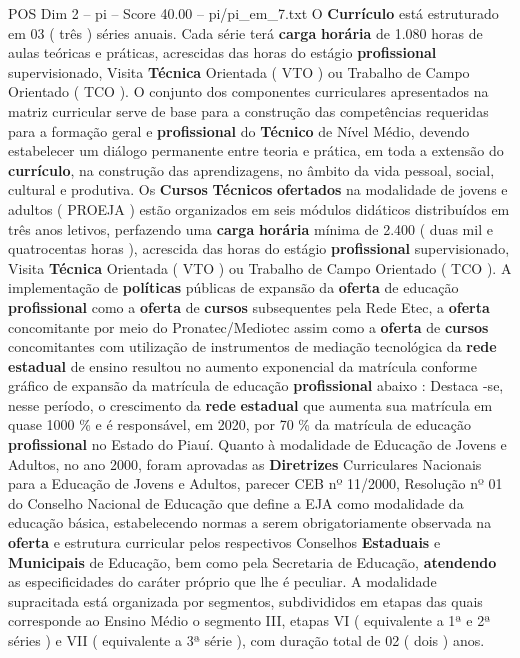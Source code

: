 \begin{textsample}{POS Dim 2 – pi – Score 40.00 – pi/pi\_em\_7.txt}
O \textbf{Currículo} está estruturado em 03 ( três ) séries anuais.
Cada série terá \textbf{carga} \textbf{horária} de 1.080 horas de aulas teóricas e práticas, acrescidas das horas do estágio \textbf{profissional} supervisionado, Visita \textbf{Técnica} Orientada ( VTO ) ou Trabalho de Campo Orientado ( TCO ).
O conjunto dos componentes curriculares apresentados na matriz curricular serve de base para a construção das competências requeridas para a formação geral e \textbf{profissional} do \textbf{Técnico} de Nível Médio, devendo estabelecer um diálogo permanente entre teoria e prática, em toda a extensão do \textbf{currículo}, na construção das aprendizagens, no âmbito da vida pessoal, social, cultural e produtiva.
Os \textbf{Cursos} \textbf{Técnicos} \textbf{ofertados} na modalidade de jovens e adultos ( PROEJA ) estão organizados em seis módulos didáticos distribuídos em três anos letivos, perfazendo uma \textbf{carga} \textbf{horária} mínima de 2.400 ( duas mil e quatrocentas horas ), acrescida das horas do estágio \textbf{profissional} supervisionado, Visita \textbf{Técnica} Orientada ( VTO ) ou Trabalho de Campo Orientado ( TCO ).
A implementação de \textbf{políticas} públicas de expansão da \textbf{oferta} de educação \textbf{profissional} como a \textbf{oferta} de \textbf{cursos} subsequentes pela Rede Etec, a \textbf{oferta} concomitante por meio do Pronatec/Mediotec assim como a \textbf{oferta} de \textbf{cursos} concomitantes com utilização de instrumentos de mediação tecnológica da \textbf{rede} \textbf{estadual} de ensino resultou no aumento exponencial da matrícula conforme gráfico de expansão da matrícula de educação \textbf{profissional} abaixo : Destaca -se, nesse período, o crescimento da \textbf{rede} \textbf{estadual} que aumenta sua matrícula em quase 1000 \% e é responsável, em 2020, por 70 \% da matrícula de educação \textbf{profissional} no Estado do Piauí.
Quanto à modalidade de Educação de Jovens e Adultos, no ano 2000, foram aprovadas as \textbf{Diretrizes} Curriculares Nacionais para a Educação de Jovens e Adultos, parecer CEB nº 11/2000, Resolução nº 01 do Conselho Nacional de Educação que define a EJA como modalidade da educação básica, estabelecendo normas a serem obrigatoriamente observada na \textbf{oferta} e estrutura curricular pelos respectivos Conselhos \textbf{Estaduais} e \textbf{Municipais} de Educação, bem como pela Secretaria de Educação, \textbf{atendendo} as especificidades do caráter próprio que lhe é peculiar.
A modalidade supracitada está organizada por segmentos, subdivididos em etapas das quais corresponde ao Ensino Médio o segmento III, etapas VI ( equivalente a 1ª e 2ª séries ) e VII ( equivalente a 3ª série ), com duração total de 02 ( dois ) anos.

\end{textsample}
